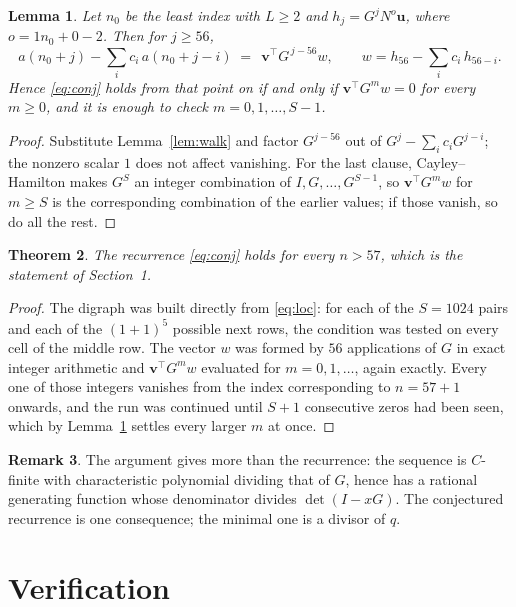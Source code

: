 \documentclass[11pt,a4paper]{article}
\theoremstyle{plain}
\newtheorem{theorem}{Theorem}
\newtheorem{lemma}[theorem]{Lemma}
\theoremstyle{definition}
\newtheorem{remark}[theorem]{Remark}
\begin{document}
\begin{lemma}\label{lem:crit}
Let $n_0$ be the least index with $L\ge2$ and $h_j=G^{j}N^{o}\mathbf{u}$, where
$o=1n_0+0-2$. Then for $j\ge56$,
\[
a(n_0+j)-\sum_i c_i\,a(n_0+j-i)\;=\;\,\mathbf{v}^{\!\top}G^{\,j-56}w,
\qquad w=h_{56}-\sum_i c_i\,h_{56-i} .
\]
Hence \eqref{eq:conj} holds from that point on if and only if
$\mathbf{v}^{\!\top}G^{m}w=0$ for every $m\ge0$, and it is enough to check
$m=0,1,\dots,S-1$.
\end{lemma}

\begin{proof}
Substitute Lemma~\ref{lem:walk} and factor $G^{j-56}$ out of
$G^{j}-\sum_ic_iG^{j-i}$; the nonzero scalar $1$ does not affect
vanishing. For the last clause, Cayley--Hamilton makes $G^{S}$ an integer combination of
$I,G,\dots,G^{S-1}$, so $\mathbf{v}^{\!\top}G^{m}w$ for $m\ge S$ is the corresponding
combination of the earlier values; if those vanish, so do all the rest.
\end{proof}

\begin{theorem}
The recurrence \eqref{eq:conj} holds for every $n>57$, which is the statement of
Section~1.
\end{theorem}

\begin{proof}
The digraph was built directly from \eqref{eq:loc}: for each of the $S=1024$ pairs and each
of the $(1+1)^{5}$ possible next rows, the condition was tested on every cell of
the middle row. The vector $w$ was formed by $56$ applications of $G$ in exact integer
arithmetic and $\mathbf{v}^{\!\top}G^{m}w$ evaluated for $m=0,1,\dots$, again exactly.
Every one of those integers vanishes from the index corresponding to $n=57+1$ onwards,
and the run was continued until $S+1$ consecutive zeros had been seen, which by
Lemma~\ref{lem:crit} settles every larger $m$ at once.
\end{proof}

\begin{remark}
The argument gives more than the recurrence: the sequence is $C$-finite with characteristic
polynomial dividing that of $G$, hence has a rational generating function whose denominator
divides $\det(I-xG)$. The conjectured recurrence is one consequence; the minimal one is a
divisor of $q$.
\end{remark}

\section{Verification}
\end{document}
